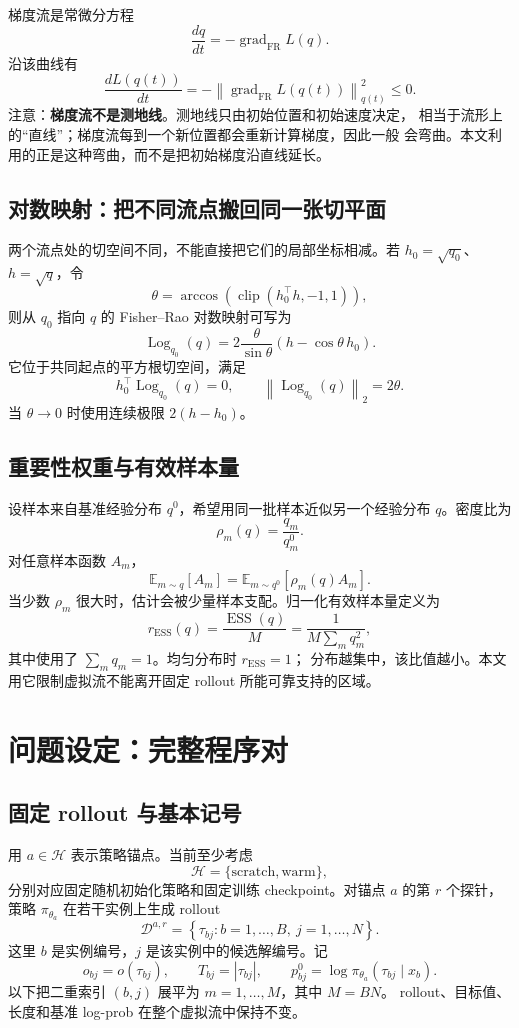 \documentclass[UTF8,11pt]{ctexart}
\newcommand{\Log}{\operatorname{Log}}
\DeclareMathOperator{\ESS}{ESS}
\begin{document}
梯度流是常微分方程
\[
    \frac{dq}{dt}
    =
    -\operatorname{grad}_{\mathrm{FR}}L(q).
\]
沿该曲线有
\[
    \frac{dL(q(t))}{dt}
    =
    -\left\|
    \operatorname{grad}_{\mathrm{FR}}L(q(t))
    \right\|_{q(t)}^2
    \le 0.
\]
注意：\textbf{梯度流不是测地线}。测地线只由初始位置和初始速度决定，
相当于流形上的“直线”；梯度流每到一个新位置都会重新计算梯度，因此一般
会弯曲。本文利用的正是这种弯曲，而不是把初始梯度沿直线延长。

\subsection{对数映射：把不同流点搬回同一张切平面}

两个流点处的切空间不同，不能直接把它们的局部坐标相减。若
\(h_0=\sqrt{q_0}\)、\(h=\sqrt q\)，令
\[
    \theta
    =
    \arccos\!\left(
    \operatorname{clip}(h_0^\top h,-1,1)
    \right),
\]
则从 \(q_0\) 指向 \(q\) 的 Fisher--Rao 对数映射可写为
\[
    \Log_{q_0}(q)
    =
    2\frac{\theta}{\sin\theta}
    \left(
    h-\cos\theta\,h_0
    \right).
\]
它位于共同起点的平方根切空间，满足
\[
    h_0^\top\Log_{q_0}(q)=0,
    \qquad
    \left\|\Log_{q_0}(q)\right\|_2=2\theta.
\]
当 \(\theta\to0\) 时使用连续极限 \(2(h-h_0)\)。

\subsection{重要性权重与有效样本量}

设样本来自基准经验分布 \(q^0\)，希望用同一批样本近似另一个经验分布
\(q\)。密度比为
\[
    \rho_m(q)=\frac{q_m}{q_m^0}.
\]
对任意样本函数 \(A_m\)，
\[
    \mathbb E_{m\sim q}[A_m]
    =
    \mathbb E_{m\sim q^0}[\rho_m(q)A_m].
\]
当少数 \(\rho_m\) 很大时，估计会被少量样本支配。归一化有效样本量定义为
\[
    r_{\mathrm{ESS}}(q)
    =
    \frac{\ESS(q)}{M}
    =
    \frac{1}{M\sum_mq_m^2},
\]
其中使用了 \(\sum_mq_m=1\)。均匀分布时 \(r_{\mathrm{ESS}}=1\)；
分布越集中，该比值越小。本文用它限制虚拟流不能离开固定 rollout
所能可靠支持的区域。

\section{问题设定：完整程序对}

\subsection{固定 rollout 与基本记号}

用 \(a\in\mathcal H\) 表示策略锚点。当前至少考虑
\[
    \mathcal H=\{\text{scratch},\text{warm}\},
\]
分别对应固定随机初始化策略和固定训练 checkpoint。对锚点 \(a\) 的第
\(r\) 个探针，策略 \(\pi_{\theta_a}\) 在若干实例上生成 rollout
\[
    \mathcal D^{a,r}
    =
    \left\{
    \tau_{bj}
    :b=1,\ldots,B,\ j=1,\ldots,N
    \right\}.
\]
这里 \(b\) 是实例编号，\(j\) 是该实例中的候选解编号。记
\[
    o_{bj}=o(\tau_{bj}),\qquad
    T_{bj}=|\tau_{bj}|,\qquad
    p^0_{bj}
    =
    \log\pi_{\theta_a}(\tau_{bj}\mid x_b).
\]
以下把二重索引 \((b,j)\) 展平为 \(m=1,\ldots,M\)，其中 \(M=BN\)。
rollout、目标值、长度和基准 log-prob 在整个虚拟流中保持不变。
\end{document}
